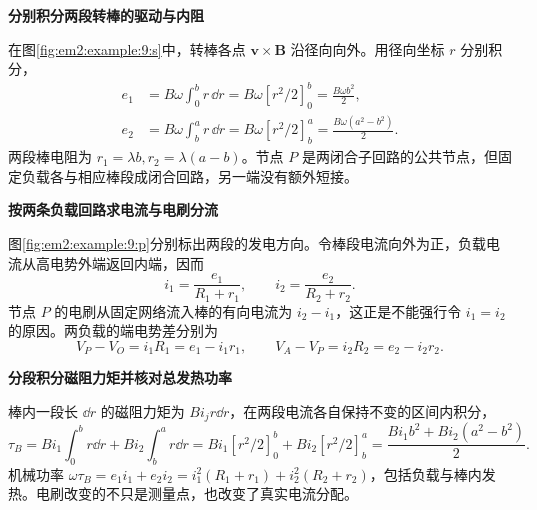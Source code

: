 \begin{solution}\textbf{分别积分两段转棒的驱动与内阻}\par\nobreak
在图\ref{fig:em2:example:9:s}中，转棒各点 $\bm v\times\bm B$ 沿径向向外。用径向坐标 $r$ 分别积分，
\begin{align*}
e_1&=B\omega\int_0^b r\,\dd r
=B\omega[r^2/2]_0^b=\frac{B\omega b^2}{2},\\
e_2&=B\omega\int_b^a r\,\dd r
=B\omega[r^2/2]_b^a=\frac{B\omega(a^2-b^2)}2.
\end{align*}两段棒电阻为 $r_1=\lambda b,r_2=\lambda(a-b)$。节点 $P$ 是两闭合子回路的公共节点，但固定负载各与相应棒段成闭合回路，另一端没有额外短接。



\par\medskip{}\noindent\textbf{按两条负载回路求电流与电刷分流}\par\nobreak
图\ref{fig:em2:example:9:p}分别标出两段的发电方向。令棒段电流向外为正，负载电流从高电势外端返回内端，因而
\[i_1=\frac{e_1}{R_1+r_1},\qquad i_2=\frac{e_2}{R_2+r_2}.\]
节点 $P$ 的电刷从固定网络流入棒的有向电流为 $i_2-i_1$，这正是不能强行令 $i_1=i_2$ 的原因。两负载的端电势差分别为
\[
V_P-V_O=i_1R_1=e_1-i_1r_1,\qquad
V_A-V_P=i_2R_2=e_2-i_2r_2.
\]



\par\medskip{}\noindent\textbf{分段积分磁阻力矩并核对总发热功率}\par\nobreak
棒内一段长 $\dd r$ 的磁阻力矩为 $Bi_jr\dd r$，在两段电流各自保持不变的区间内积分，
\[
 \tau_B=Bi_1\int_0^b r\dd r+Bi_2\int_b^a r\dd r
 =Bi_1[r^2/2]_0^b+Bi_2[r^2/2]_b^a
 =\frac{Bi_1b^2+Bi_2(a^2-b^2)}2.
\]机械功率 $\omega\tau_B=e_1i_1+e_2i_2=i_1^2(R_1+r_1)+i_2^2(R_2+r_2)$，包括负载与棒内发热。电刷改变的不只是测量点，也改变了真实电流分配。\end{solution}
